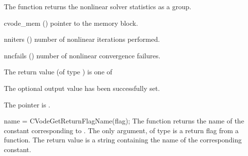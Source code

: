 {
  The function  returns the
  {\cvode} nonlinear solver statistics as a group.
}
{
  \begin{args}
  \item[cvode\_mem] ()
    pointer to the {\cvode} memory block.
  \item[nniters] ()
    number of nonlinear iterations performed.
  \item[nncfails] ()
    number of nonlinear convergence failures.
  \end{args}
}
{
  The return value  (of type ) is one of
  \begin{args}
  \item[\Id{CV\_SUCCESS}] 
    The optional output value has been successfully set.
  \item[\Id{CV\_MEM\_NULL}]
    The  pointer is .
  \end{args}
}
{}
{
  name = CVodeGetReturnFlagName(flag);
}
{
  The function  returns the
  name of the {\cvode} constant corresponding to .
}
{
  The only argument, of type  is a return flag from a {\cvode} function.
}
{
  The return value is a string containing the name of the corresponding constant.
}
{}

